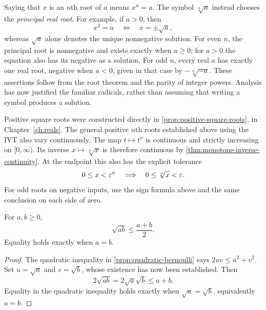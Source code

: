 \begin{remark}
Saying that $x$ is an $n$th root of $a$ means $x^n=a$.
The symbol $\sqrt[n]{a}$ instead chooses the \emph{principal real root}.
For example, if $a>0$, then
\[
x^2=a\quad\Longleftrightarrow\quad x=\pm\sqrt a,
\]
whereas $\sqrt a$ alone denotes the unique nonnegative solution.
For even $n$, the principal root is nonnegative and exists exactly when
$a\geq0$; for $a>0$ the equation also has its negative as a solution.
For odd $n$, every real $a$ has exactly one real root, negative when $a<0$,
given in that case by $-\sqrt[n]{-a}$. These assertions follow from the
root theorem and the parity of integer powers. Analysis has now justified
the familiar radicals, rather than assuming that writing a symbol produces
a solution.
\end{remark}

\begin{remark}
Positive square roots were constructed directly in
\cref{prop:positive-square-roots}, in Chapter~\ref{ch:reals}.
The general positive $n$th roots established above using the IVT
also vary continuously. The map \(t\mapsto t^n\) is continuous and
strictly increasing on \([0,\infty)\). Its inverse
\(x\mapsto\sqrt[n]{x}\) is therefore continuous by
\cref{thm:monotone-inverse-continuity}. At the endpoint this also has the
explicit tolerance
\[
0\leq x<\varepsilon^n\quad\Longrightarrow\quad
0\leq\sqrt[n]{x}<\varepsilon.
\]
For odd roots on negative inputs, use the sign formula above and the same
conclusion on each side of zero.
\end{remark}

\begin{proposition}
\label{prop:two-variable-amgm}
For \(a,b\geq0\),
\[
\boxed{\sqrt{ab}\leq\frac{a+b}{2}.}
\]
Equality holds exactly when \(a=b\).
\end{proposition}
\begin{proof}
The quadratic inequality in \cref{prop:quadratic-bernoulli} says
\(2uv\leq u^2+v^2\). Set \(u=\sqrt a\) and \(v=\sqrt b\), whose existence
has now been established. Then
\[
2\sqrt{ab}=2\sqrt a\sqrt b\leq a+b.
\]
Equality in the quadratic inequality holds exactly when
\(\sqrt a=\sqrt b\), equivalently \(a=b\).
\end{proof}

